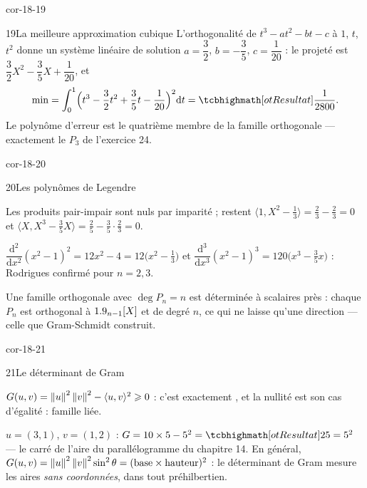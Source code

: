 \begin{blocLivre}{cor-18-19}
\begin{corrige}{19}{La meilleure approximation cubique}
L'orthogonalité de $t^{3}-at^{2}-bt-c$ à $1$, $t$, $t^{2}$ donne un
système linéaire de solution
$a=\dfrac32$, $b=-\dfrac35$, $c=\dfrac{1}{20}$ : le projeté est
$\dfrac32X^{2}-\dfrac35X+\dfrac1{20}$, et
\[
\min=\int_0^1\Bigl(t^{3}-\frac32t^{2}+\frac35t-\frac1{20}\Bigr)^{2}
\mathrm{d}t=\res{\frac{1}{2800}} .
\]
Le polynôme d'erreur est le quatrième membre de la famille orthogonale —
exactement le $P_3$ de l'exercice 24.
\end{corrige}
\end{blocLivre}

\begin{blocLivre}{cor-18-20}
\begin{corrige}{20}{Les polynômes de Legendre}
\begin{questions}
  \item Les produits pair-impair sont nuls par imparité ; restent
    $\langle1,X^{2}-\tfrac13\rangle=\tfrac23-\tfrac23=0$ et
    $\langle X,X^{3}-\tfrac35X\rangle=\tfrac25-\tfrac35\cdot\tfrac23=0$.
  \item $\dfrac{\mathrm{d}^{2}}{\mathrm{d}x^{2}}(x^{2}-1)^{2}
    =12x^{2}-4=12\bigl(x^{2}-\tfrac13\bigr)$ et
    $\dfrac{\mathrm{d}^{3}}{\mathrm{d}x^{3}}(x^{2}-1)^{3}
    =120\bigl(x^{3}-\tfrac35x\bigr)$ : Rodrigues confirmé pour $n=2,3$.
  \item Une famille orthogonale avec $\deg P_n=n$ est déterminée à
    scalaires près : chaque $P_n$ est orthogonal à $1.9_{n-1}[X]$ et de
    degré $n$, ce qui ne laisse qu'une direction — celle que
    Gram-Schmidt construit.
\end{questions}
\end{corrige}
\end{blocLivre}

\begin{blocLivre}{cor-18-21}
\begin{corrige}{21}{Le déterminant de Gram}
\begin{questions}
  \item $G(u,v)=\left\lVert u\right\rVert^{2}\left\lVert v\right\rVert^{2}-\langle u,v\rangle^{2}
    \geqslant0$ : c'est exactement , et la
    nullité est son cas d'égalité : famille liée.
  \item $u=(3,1)$, $v=(1,2)$ :
    $G=10\times5-5^{2}=\res{25}=5^{2}$ — le carré de l'aire du
    parallélogramme du chapitre 14. En général,
    $G(u,v)=\left\lVert u\right\rVert^{2}\left\lVert v\right\rVert^{2}\sin^{2}\theta
    =(\text{base}\times\text{hauteur})^{2}$ : le déterminant de Gram
    mesure les aires \emph{sans coordonnées}, dans tout préhilbertien.
\end{questions}
\end{corrige}
\end{blocLivre}

